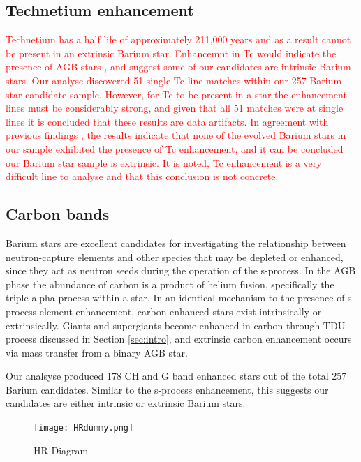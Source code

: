 \documentclass[a4paper,fleqn,usenatbib]{mnras}
\newcommand{\todo}[1]{\textcolor{red}{#1}}
\begin{document}


\subsection{Technetium enhancement}
\todo{Technetium has a half life of approximately 211,000 years and as a result cannot be present in an extrinsic Barium star. Enhancemnt in Tc would indicate the presence of AGB stars \citep{jorissen1993}, and suggest some of our candidates are intrinsic Barium stars. Our analyse discovered 51 single Tc line matches within our 257 Barium star candidate sample. However, for Tc to be present in  a star the enhancement lines must be considerably strong, and given that all 51 matches were at single lines it is concluded that these results are data artifacts. In agreement with previous findings \citep[e.g.][]{little1987,smith1984,smith1983}, the results indicate that none of the evolved Barium stars in our sample exhibited the presence of Tc enhancement, and it can be concluded our Barium star sample is extrinsic. It is noted, Tc enhancement is a very difficult line to analyse and that this conclusion is not concrete.}


\subsection{Carbon bands}
Barium stars are excellent candidates for investigating the relationship between neutron-capture elements and other species that may be depleted or enhanced, since they act as neutron seeds during the operation of the s-process. In the AGB phase the abundance of carbon is a product of helium fusion, specifically the triple-alpha process within a star. In an identical mechanism to the presence of s-process element enhancement, carbon enhanced stars exist intrinsically or extrinsically. Giants and supergiants become enhanced in carbon through TDU process discussed in Section \ref{sec:intro}, and extrinsic carbon enhancement occurs via mass transfer from a binary AGB star. 

Our analsyse produced 178 CH and G band enhanced stars out of the total 257 Barium candidates. Similar to the s-process enhancement, this suggests our candidates are either intrinsic or extrinsic Barium stars.

\begin{figure}
	\texttt{[image: HRdummy.png]}
    \caption{HR Diagram}
    \label{fig:figure2}
\end{figure}
\end{document}
